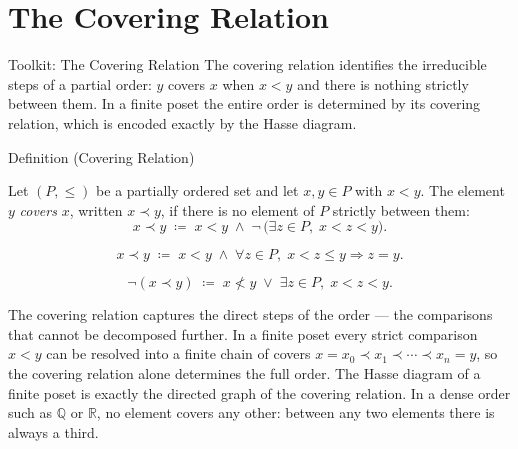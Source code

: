
\section{The Covering Relation}
\label{sec:covering-relation}

\begin{toolkitbox}{Toolkit: The Covering Relation}
The covering relation identifies the irreducible steps of a partial order:
$y$ covers $x$ when $x < y$ and there is nothing strictly between them.
In a finite poset the entire order is determined by its covering relation,
which is encoded exactly by the Hasse diagram.
\end{toolkitbox}


\begin{definitionbox}{Definition (Covering Relation)}
\begin{definition}
\label{def:covering-relation}
Let $(P, \leq)$ be a partially ordered set and let $x, y \in P$ with
$x < y$.  The element $y$ \emph{covers} $x$, written $x \prec y$, if
there is no element of $P$ strictly between them:
\[
x \prec y
\;\coloneqq\;
x < y
\;\land\;
\neg\,\bigl(\exists z \in P,\; x < z < y\bigr).
\]
\end{definition}
\end{definitionbox}

\begin{remark*}
\[
x \prec y
\;\coloneqq\;
x < y
\;\land\;
\forall z \in P,\; x < z \leq y \Longrightarrow z = y.
\]
\end{remark*}

\begin{remark*}
\[
\neg(x \prec y)
\;\coloneqq\;
x \not< y \;\lor\; \exists z \in P,\; x < z < y.
\]
\end{remark*}

\begin{remark*}[Interpretation]
The covering relation captures the direct steps of the order — the
comparisons that cannot be decomposed further.  In a finite poset every
strict comparison $x < y$ can be resolved into a finite chain of covers
$x = x_0 \prec x_1 \prec \cdots \prec x_n = y$, so the covering relation
alone determines the full order.  The Hasse diagram of a finite poset is
exactly the directed graph of the covering relation.  In a dense order
such as $\mathbb{Q}$ or $\mathbb{R}$, no element covers any other: between
any two elements there is always a third.
\end{remark*}

